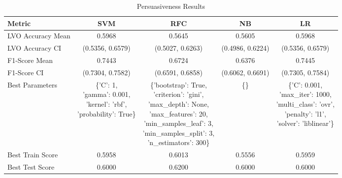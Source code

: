 \usepackage{makecell}

\begin{table}[h!]
\centering
\begin{tabular}{|l|c|c|c|c|}
\hline
\textbf{Metric}           & \textbf{SVM}    & \textbf{RFC}    & \textbf{NB}     & \textbf{LR}     \\ \hline
LVO Accuracy Mean         & 0.5968          & 0.5645          & 0.5605          & 0.5968          \\ \hline
LVO Accuracy CI           & (0.5356, 0.6579)& (0.5027, 0.6263)& (0.4986, 0.6224)& (0.5356, 0.6579)\\ \hline
F1-Score Mean             & 0.7443          & 0.6724          & 0.6376          & 0.7445          \\ \hline
F1-Score CI               & (0.7304, 0.7582)& (0.6591, 0.6858)& (0.6062, 0.6691)& (0.7305, 0.7584)\\ \hline
Best Parameters           & \makecell[l]{\{'C': 1,\\ 'gamma': 0.001,\\ 'kernel': 'rbf',\\ 'probability': True\}} & \makecell[l]{\{'bootstrap': True,\\ 'criterion': 'gini',\\ 'max\_depth': None,\\ 'max\_features': 20,\\ 'min\_samples\_leaf': 3,\\ 'min\_samples\_split': 3,\\ 'n\_estimators': 300\}} & \{\} & \makecell[l]{\{'C': 0.001,\\ 'max\_iter': 1000,\\ 'multi\_class': 'ovr',\\ 'penalty': 'l1',\\ 'solver': 'liblinear'\}} \\ \hline
Best Train Score          & 0.5958          & 0.6013          & 0.5556          & 0.5959          \\ \hline
Best Test Score           & 0.6000          & 0.6200          & 0.6000          & 0.6000          \\ \hline
\end{tabular}
\caption{Persuasiveness Results}
\label{table:persuasiveness}
\end{table}

